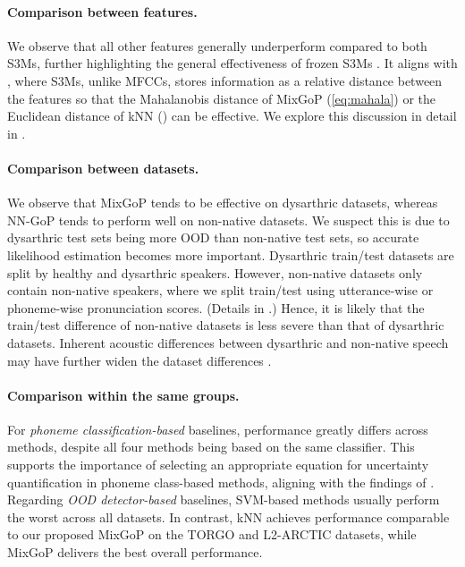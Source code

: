 \paragraph{Comparison between features.}
We observe that all other features generally underperform compared to both S3Ms, further highlighting the general effectiveness of frozen S3Ms \citep{yang21c_interspeech}.
It aligns with \citet{choi2022opening}, where S3Ms, unlike MFCCs, stores information as a relative distance between the features so that the Mahalanobis distance of MixGoP (\cref{eq:mahala}) or the Euclidean distance of kNN () can be effective.
We explore this discussion in detail in .


\paragraph{Comparison between datasets.}
We observe that MixGoP tends to be effective on dysarthric datasets, whereas NN-GoP tends to perform well on non-native datasets.
We suspect this is due to dysarthric test sets being more OOD than non-native test sets, so accurate likelihood estimation becomes more important.
Dysarthric train/test datasets are split by healthy and dysarthric speakers.
However, non-native datasets only contain non-native speakers, where we split train/test using utterance-wise or phoneme-wise pronunciation scores.
(Details in .)
Hence, it is likely that the train/test difference of non-native datasets is less severe than that of dysarthric datasets.
Inherent acoustic differences between dysarthric and non-native speech may have further widen the dataset differences \citep{yeo23_interspeech,korzekwa2021mispronunciation}.




\paragraph{Comparison within the same groups.}
For \textit{phoneme classification-based} baselines, performance greatly differs across methods, despite all four methods being based on the same classifier.
This supports the importance of selecting an appropriate equation for uncertainty quantification in phoneme class-based methods, aligning with the findings of \citet{yeo23_interspeech}.
Regarding \textit{OOD detector-based} baselines, SVM-based methods usually perform the worst across all datasets.
In contrast, kNN achieves performance comparable to our proposed MixGoP on the TORGO and L2-ARCTIC datasets, while MixGoP delivers the best overall performance.
